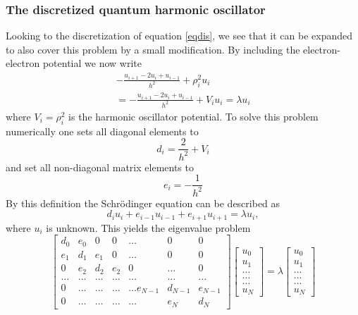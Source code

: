 \documentclass[%
reprint,
amsmath, 
amssymb, 
aps,]{revtex4-1}
\begin{document}
		\subsubsection{The discretized quantum harmonic oscillator}
Looking to the discretization of equation \ref{eqdis}, we see that it can be expanded to also cover this problem by a small modification. By including the electron-electron potential we now write 
			\begin{equation}\label{eqho2}
\begin{aligned}
	-\frac{u_{i+1} -2u_i +u_{i-1}}{h^2}+\rho_i^2u_i \\=-\frac{u_{i+1} -2u_i +u_{i-1} }{h^2}+V_iu_i  = \lambda u_i
\end{aligned}
			\end{equation}
where $V_i=\rho_i^2$ is the harmonic oscillator potential. To solve this problem numerically one sets all diagonal elements to 
			\begin{equation}\label{hoeq3}
d_i=\frac{2}{h^2}+V_i
			\end{equation}
and set all non-diagonal matrix elements to
			\begin{equation}\label{hoeq4}
e_i=-\frac{1}{h^2}
			\end{equation}
By this definition the Schrödinger equation can be described as
			\begin{equation*}
d_i u_i + e_{i - 1} u_{i - 1} + e_{i + 1} u_{i + 1}  = \lambda u_i,
			\end{equation*}
where $u_i$ is unknown. This yields the eigenvalue problem
			\begin{equation}\label{evho}
\begin{bmatrix}d_0 & e_0 & 0   & 0    & \dots  &0     & 0 \\
e_1 & d_1 & e_1 & 0    & \dots  &0     &0 \\
0   & e_2 & d_2 & e_2  &0       &\dots & 0\\
\dots  & \dots & \dots & \dots  &\dots      &\dots & \dots\\
0   & \dots & \dots & \dots  &\dots  e_{N-1}     &d_{N-1} & e_{N-1}\\
0   & \dots & \dots & \dots  &\dots       &e_{N} & d_{N}
\end{bmatrix}  \begin{bmatrix} u_{0} \\
u_{1} \\
\dots\\ \dots\\ \dots\\
u_{N}
\end{bmatrix}=\lambda \begin{bmatrix} u_{0} \\
u_{1} \\
\dots\\ \dots\\ \dots\\
u_{N}
\end{bmatrix}
			\end{equation}
\end{document}
